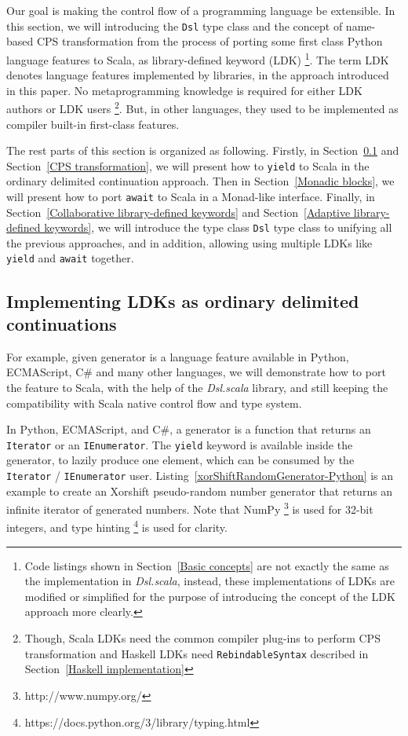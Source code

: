 Our goal is making the control flow of a programming language be extensible. In this section, we will introducing the \lstinline{Dsl} type class and the concept of name-based CPS transformation from the process of porting some first class Python language features to Scala, as library-defined keyword (LDK) \footnote{Code listings shown in Section~\ref{Basic concepts} are not exactly the same as the implementation in \textit{Dsl.scala}, instead, these implementations of LDKs are modified or simplified for the purpose of introducing the concept of the LDK approach more clearly.}. The term LDK denotes language features implemented by libraries, in the approach introduced in this paper. No metaprogramming knowledge is required for either LDK authors or LDK users \footnote{ Though, Scala LDKs need the common compiler plug-ins to perform CPS transformation and Haskell LDKs need \lstinline{RebindableSyntax} described in Section~\ref{Haskell implementation}}. But, in other languages, they used to be implemented as  compiler built-in first-class features.

The rest parts of this section is organized as following. Firstly, in Section~\ref{Implementing LDKs as ordinary delimited continuations} and Section~\ref{CPS transformation}, we will present how to \lstinline{yield} to Scala in the ordinary delimited continuation approach. Then in Section~\ref{Monadic blocks}, we will present how to port \lstinline{await} to Scala in a Monad-like interface. Finally, in Section~\ref{Collaborative library-defined keywords} and Section~\ref{Adaptive library-defined keywords}, we will introduce the type class \lstinline{Dsl} type class to unifying all the previous approaches, and in addition, allowing using multiple LDKs like \lstinline{yield} and \lstinline{await} together.

\subsection{Implementing LDKs as ordinary delimited continuations}\label{Implementing LDKs as ordinary delimited continuations}

For example, given generator is a language feature available in Python, ECMAScript, C\# and many other languages, we will demonstrate how to port the feature to Scala, with the help of the \textit{Dsl.scala} library, and still keeping the compatibility with Scala native control flow and type system.

In Python, ECMAScript, and C\#, a generator is a function that returns an \lstinline{Iterator} or an \lstinline{IEnumerator}. The \lstinline{yield} keyword is available inside the generator, to lazily produce one element, which can be consumed by the \lstinline{Iterator} / \lstinline{IEnumerator} user. Listing~\ref{xorShiftRandomGenerator-Python} is an example to create an Xorshift \cite{marsaglia2003xorshift} pseudo-random number generator that returns an infinite iterator of generated numbers. Note that NumPy \footnote{http://www.numpy.org/} is used for 32-bit integers, and type hinting \footnote{https://docs.python.org/3/library/typing.html} is used for clarity.

